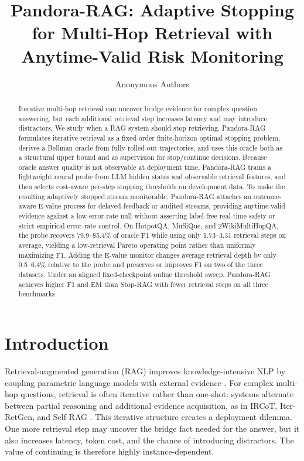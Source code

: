 \documentclass{article}
\title{Pandora-RAG: Adaptive Stopping for Multi-Hop Retrieval with Anytime-Valid Risk Monitoring}
\author{Anonymous Authors}
\newcommand{\method}{Pandora-RAG}
\newcommand{\hotpot}{HotpotQA}
\newcommand{\musique}{MuSiQue}
\newcommand{\twowiki}{2WikiMultiHopQA}
\begin{document}
\maketitle

\begin{abstract}
Iterative multi-hop retrieval can uncover bridge evidence for complex question answering, but each additional retrieval step increases latency and may introduce distractors. We study when a RAG system should stop retrieving. \method{} formulates iterative retrieval as a fixed-order finite-horizon optimal stopping problem, derives a Bellman oracle from fully rolled-out trajectories, and uses this oracle both as a structural upper bound and as supervision for stop/continue decisions. Because oracle answer quality is not observable at deployment time, \method{} trains a lightweight neural probe from LLM hidden states and observable retrieval features, and then selects cost-aware per-step stopping thresholds on development data. To make the resulting adaptively stopped stream monitorable, \method{} attaches an outcome-aware E-value process for delayed-feedback or audited streams, providing anytime-valid evidence against a low-error-rate null without asserting label-free real-time safety or strict empirical error-rate control. On \hotpot{}, \musique{}, and \twowiki{}, the probe recovers 79.9--85.4\% of oracle F1 while using only 1.73--3.31 retrieval steps on average, yielding a low-retrieval Pareto operating point rather than uniformly maximizing F1. Adding the E-value monitor changes average retrieval depth by only 0.5--6.4\% relative to the probe and preserves or improves F1 on two of the three datasets. Under an aligned fixed-checkpoint online threshold sweep, \method{} achieves higher F1 and EM than Stop-RAG with fewer retrieval steps on all three benchmarks.
\end{abstract}

\section{Introduction}

Retrieval-augmented generation (RAG) improves knowledge-intensive NLP by coupling parametric language models with external evidence \citep{lewisRetrievalAugmentedGenerationKnowledgeIntensive2020}. For complex multi-hop questions, retrieval is often iterative rather than one-shot: systems alternate between partial reasoning and additional evidence acquisition, as in IRCoT, Iter-RetGen, and Self-RAG \citep{trivediInterleavingRetrievalChainofThought2023,shaoEnhancingRetrievalAugmentedLarge2023,asaiSelfRAGLearningRetrieve2023}. This iterative structure creates a deployment dilemma. One more retrieval step may uncover the bridge fact needed for the answer, but it also increases latency, token cost, and the chance of introducing distractors. The value of continuing is therefore highly instance-dependent.
\end{document}
